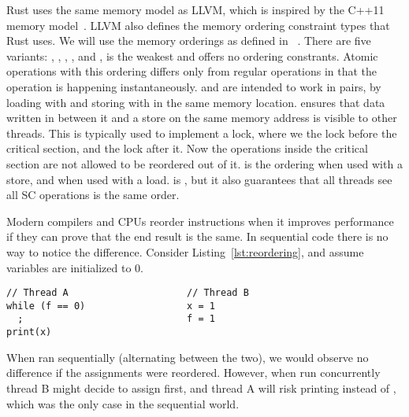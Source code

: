 \documentclass[a4paper,twoside]{report}
\begin{document}
Rust uses the same memory model as LLVM, which is inspired by the C++11 memory
model~\cite{llvmmm}. LLVM also defines the memory ordering constraint types that
Rust uses. We will use the memory orderings as defined in
~\cite{rust-ordering}. There are five variants:
, , , , and
,  is the weakest and offers no ordering
constrants.  Atomic operations with this ordering differs only from regular
operations in that the operation is happening instantaneously.
 and  are intended to work in pairs, by loading with
 and storing with  in the same memory location.
 ensures that data written in between it and a 
store on the same memory address is visible to other threads. This is typically
used to implement a lock, where we  the lock before the critical
section, and  the lock after it. Now the operations inside the
critical section are not allowed to be reordered out of it.
 is the  ordering when used with a store, and
 when used with a load.  is , but it
also guarantees that all threads see all SC operations is the same order.


Modern compilers and CPUs reorder instructions when it improves
performance if they can prove that the end result is the same.  In sequential
code there is no way to notice the difference.  Consider
Listing~\ref{lst:reordering}, and assume variables are initialized to 0.
\begin{lstlisting}[caption=Instruction reordering,label=lst:reordering]
// Thread A                     // Thread B
while (f == 0)                  x = 1
  ;                             f = 1
print(x)
\end{lstlisting}
When ran sequentially (alternating between the two), we would observe no
difference if the assignments were reordered. However, when run concurrently
thread B might decide to assign  first, and thread A will risk
printing  instead of , which was the only case in the
sequential world.
\end{document}
